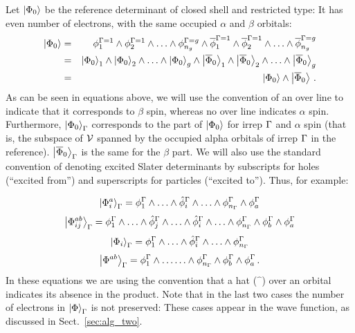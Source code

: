 Let $\ket{\Phi_0}$ be the reference determinant of closed shell and restricted type:
It has even number of electrons, with the same occupied $\alpha$ and $\beta$ orbitals:
\begin{eqnarray}
  \ket{\Phi_0}
  &=& \phi_1^{\irp=1} \w \phi_2^{\irp=1} \w
      \dots \w \phi_{n_g}^{\irp=g} \w
      \overline{\phi}_1^{\irp=1} \w \overline{\phi}_2^{\irp=1} \w
      \dots \w \overline{\phi}_{n_g}^{\irp=g}\\
  &=& \ket{\Phi_0}_1 \w \ket{\Phi_0}_2 \w
      \dots \w \ket{\Phi_0}_g \w
      \ket{\overline{\Phi}_0}_1 \w \ket{\overline{\Phi}_0}_2 \w
      \dots \w \ket{\overline{\Phi}_0}_g\\
  &=& \ket{\Phi_0} \w \ket{\overline{\Phi}_0}\,.
\end{eqnarray}
As can be seen in equations above, we will use the convention of an over line to indicate that it corresponds to $\beta$ spin, whereas no over line indicates $\alpha$ spin.
Furthermore, $\ket{\Phi_0}_{\Gamma}$ corresponds to the part of $\ket{\Phi_0}$ for irrep $\Gamma$ and $\alpha$ spin (that is, the subspace of $\mathcal{V}{}$ spanned by the occupied alpha orbitals of irrep $\Gamma$ in the reference).
$\ket{\overline{\Phi}_0}_{\Gamma}$ is the same for the $\beta$ part.
We will also use the standard convention of denoting excited Slater determinants by subscripts for holes (``excited from'') and superscripts for particles (``excited to'').
Thus, for example:

\begin{equation}
  \ket{\Phi_i^a}_\irp = \phi_1^\irp \w \dots \w \hat{\phi}_i^\irp \w
  \dots \w \phi_{n_\irp}^\irp \w \phi_a^\irp
\end{equation}
\begin{equation}
  \ket{\Phi_{ij}^{ab}}_\irp = \phi_1^\irp \w \dots
  \w \hat{\phi}_j^\irp \w \dots \w \hat{\phi}_i^\irp \w
  \dots \w \phi_{n_\irp}^\irp \w \phi_b^\irp \w \phi_a^\irp
\end{equation}
\begin{equation}
  \ket{\Phi_i}_\irp = \phi_1^\irp \w \dots \w \hat{\phi}_i^\irp \w
  \dots \w \phi_{n_\irp}^\irp
\end{equation}
\begin{equation}
  \ket{\Phi^{ab}}_\irp = \phi_1^\irp \w \dots
  \dots \w \phi_{n_\irp}^\irp \w \phi_b^\irp \w \phi_a^\irp\,.
\end{equation}
In these equations we are using the convention that a hat ($\hat{\phantom{a}}$) over an orbital indicates its absence in the product.
Note that in the last two cases the number of electrons in $\ket{\Phi}_{\Gamma}$ is not preserved:
These cases appear in the wave function, as discussed in Sect.~\ref{sec:alg_two}.

